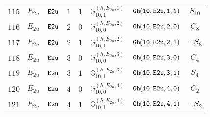 \documentclass[fleqn,8pt]{jsarticle}
\begin{document}
\begin{table}[ht!]
\begin{center}
\begin{tabular}{cccccccc}
$ 115 $ & $ E_{2u} $ & $ {\tt E2u} $ & $ 1 $ & $ 1 $ & $ \mathbb{G}_{10,1}^{(h,E_{2u},1)} $ & $ {\tt Gh(10,E2u,1,1)} $ & $ S_{10} $ \\
$ 116 $ & $ E_{2u} $ & $ {\tt E2u} $ & $ 2 $ & $ 0 $ & $ \mathbb{G}_{10,0}^{(h,E_{2u},2)} $ & $ {\tt Gh(10,E2u,2,0)} $ & $ C_{8} $ \\
$ 117 $ & $ E_{2u} $ & $ {\tt E2u} $ & $ 2 $ & $ 1 $ & $ \mathbb{G}_{10,1}^{(h,E_{2u},2)} $ & $ {\tt Gh(10,E2u,2,1)} $ & $ - S_{8} $ \\
$ 118 $ & $ E_{2u} $ & $ {\tt E2u} $ & $ 3 $ & $ 0 $ & $ \mathbb{G}_{10,0}^{(h,E_{2u},3)} $ & $ {\tt Gh(10,E2u,3,0)} $ & $ C_{4} $ \\
$ 119 $ & $ E_{2u} $ & $ {\tt E2u} $ & $ 3 $ & $ 1 $ & $ \mathbb{G}_{10,1}^{(h,E_{2u},3)} $ & $ {\tt Gh(10,E2u,3,1)} $ & $ S_{4} $ \\
$ 120 $ & $ E_{2u} $ & $ {\tt E2u} $ & $ 4 $ & $ 0 $ & $ \mathbb{G}_{10,0}^{(h,E_{2u},4)} $ & $ {\tt Gh(10,E2u,4,0)} $ & $ C_{2} $ \\
$ 121 $ & $ E_{2u} $ & $ {\tt E2u} $ & $ 4 $ & $ 1 $ & $ \mathbb{G}_{10,1}^{(h,E_{2u},4)} $ & $ {\tt Gh(10,E2u,4,1)} $ & $ - S_{2} $ \\
 \hline \hline
\end{tabular}
\end{center}
\end{table}
\end{document}
